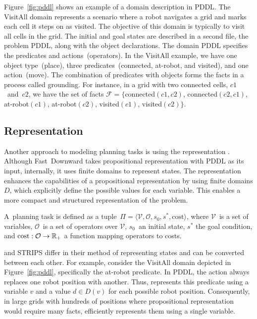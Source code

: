 Figure~\ref{fig:pddl} shows an example of a domain description in PDDL. The VisitAll domain represents a scenario where a robot navigates a grid and marks each cell it steps on as visited. The objective of this domain is typically to visit all cells in the grid. The initial and goal states are described in a second file, the problem PDDL, along with the object declarations. The domain PDDL specifies the predicates and actions~(operators). In the VisitAll example, we have one object type~(place), three predicates~(connected, at-robot, and visited), and one action~(move). The combination of predicates with objects forms the facts in a process called grounding. For instance, in a grid with two connected cells, $c1$~and~$c2$, we have the set of facts $\mathcal{F}=\{$connected$(c1,c2)$, \mbox{connected$(c2,c1)$}, \mbox{at-robot$(c1)$}, \mbox{at-robot$(c2)$}, \mbox{visited$(c1)$}, visited$(c2)\}$.

\subsection{\sas Representation}
\label{sec:background_sas}

Another approach to modeling planning tasks is using the \sas representation \cite{Backstrom.Nebel/1995}. Although Fast~Downward takes propositional representation with PDDL as its input, internally, it uses finite domains to represent states. The \sas representation enhances the capabilities of a propositional representation by using finite domains $D$, which explicitly define the possible values for each variable. This enables a more compact and structured representation of the problem.

\begin{definition}\label{def:sasplanningtask}
    A~\sas planning task is defined as a tuple~$\Pi=\langle\mathcal{V},\mathcal{O},s_0,s^*, \text{cost}\rangle$, where $\mathcal{V}$~is a set of variables, $\mathcal{O}$~is a set of operators over $\mathcal{V}$, $s_0$~an initial state, $s^*$ the goal condition, and $\text{cost}:\mathcal{O}\rightarrow\mathbb{R}_{+}$ a function mapping operators to costs.
\end{definition}

\sas and STRIPS differ in their method of representing states and can be converted between each other. For example, consider the VisitAll domain depicted in Figure~\ref{fig:pddl}, specifically the at-robot predicate. In PDDL, the action always replaces one robot position with another. Thus, \sas represents this predicate using a variable $v$ and a value $d \in D(v)$ for each possible robot position. Consequently, in large grids with hundreds of positions where propositional representation would require many facts, \sas efficiently represents them using a single variable.

